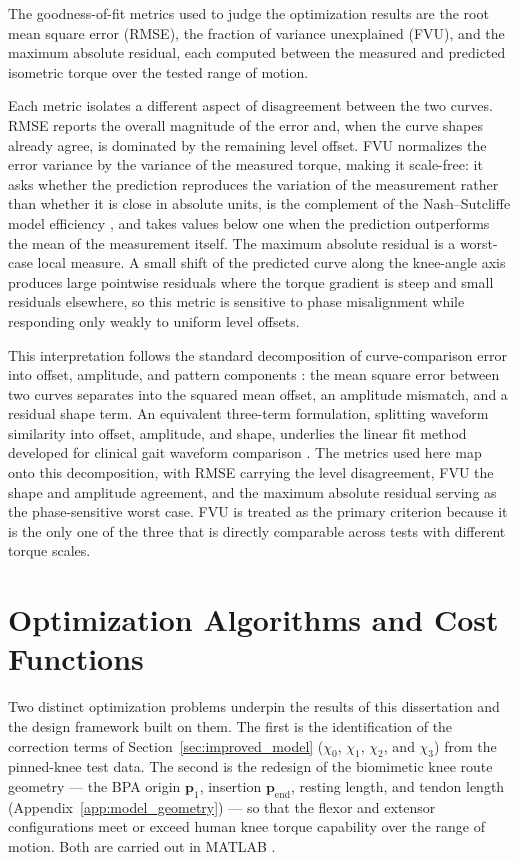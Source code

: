 The goodness-of-fit metrics used to judge the optimization results are the root mean square error (RMSE), the fraction of variance unexplained (FVU), and the maximum absolute residual, each computed between the measured and predicted isometric torque over the tested range of motion.

Each metric isolates a different aspect of disagreement between the two curves. RMSE reports the overall magnitude of the error and, when the curve shapes already agree, is dominated by the remaining level offset. FVU normalizes the error variance by the variance of the measured torque, making it scale-free: it asks whether the prediction reproduces the variation of the measurement rather than whether it is close in absolute units, is the complement of the Nash--Sutcliffe model efficiency \citep{nash_river_1970}, and takes values below one when the prediction outperforms the mean of the measurement itself. The maximum absolute residual is a worst-case local measure. A small shift of the predicted curve along the knee-angle axis produces large pointwise residuals where the torque gradient is steep and small residuals elsewhere, so this metric is sensitive to phase misalignment while responding only weakly to uniform level offsets.

This interpretation follows the standard decomposition of curve-comparison error into offset, amplitude, and pattern components \citep{taylor_summarizing_2001}: the mean square error between two curves separates into the squared mean offset, an amplitude mismatch, and a residual shape term. An equivalent three-term formulation, splitting waveform similarity into offset, amplitude, and shape, underlies the linear fit method developed for clinical gait waveform comparison \citep{iosa_assessment_2014}. The metrics used here map onto this decomposition, with RMSE carrying the level disagreement, FVU the shape and amplitude agreement, and the maximum absolute residual serving as the phase-sensitive worst case. FVU is treated as the primary criterion because it is the only one of the three that is directly comparable across tests with different torque scales.

\section{Optimization Algorithms and Cost Functions}\label{sec:optimization}

Two distinct optimization problems underpin the results of this dissertation and the design framework built on them. The first is the identification of the correction terms of Section~\ref{sec:improved_model} ($\chi_{0}$, $\chi_{1}$, $\chi_{2}$, and $\chi_{3}$) from the pinned-knee test data. The second is the redesign of the biomimetic knee route geometry --- the BPA origin $\mathbf{p}_{1}$, insertion $\mathbf{p}_{\text{end}}$, resting length, and tendon length (Appendix~\ref{app:model_geometry}) --- so that the flexor and extensor configurations meet or exceed human knee torque capability over the range of motion. Both are carried out in MATLAB \citep{mathworks_optimization_2025}.

